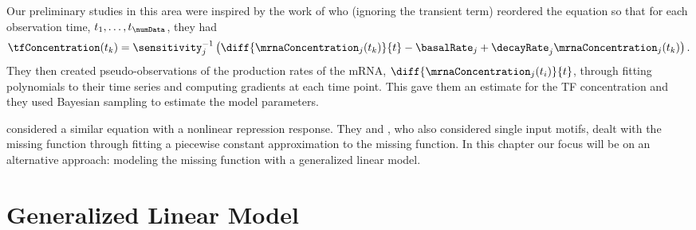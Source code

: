 \documentclass{article}
\begin{document}
Our preliminary studies in this area were inspired by the work of
\cite{Barenco:ranked06} who (ignoring the transient term) reordered
the equation so that for each observation time, $t_1, \dots,
t_\numData$, they had
\[
\tfConcentration(t_k) =
\sensitivity_j^{-1}\left(\diff{\mrnaConcentration_j(t_k)}{t} -
  \basalRate_j + \decayRate_j \mrnaConcentration_j(t_k)\right).
\]
They then created pseudo-observations of the production rates of the
mRNA, $\diff{\mrnaConcentration_j(t_i)}{t}$, through fitting
polynomials to their time series and computing gradients at each time
point. This gave them an estimate for the TF concentration and they
used Bayesian sampling to estimate the model parameters.

\cite{Khanin:repression06} considered a similar equation with a
nonlinear repression response. They and \cite{Rogers:model06b}, who
also considered single input motifs, dealt with the missing function
through fitting a piecewise constant approximation to the missing
function. In this chapter our focus will be on an alternative
approach: modeling the missing function with a generalized linear
model.

\section{Generalized Linear Model}
\end{document}
